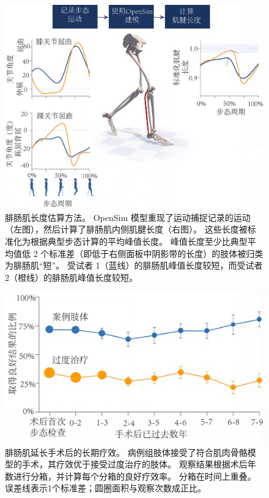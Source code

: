\begin{figure}[!htb]
	\centering
	\includegraphics[width=1.0\linewidth]{chap13/13_4}
	\caption{腓肠肌长度估算方法。
		OpenSim 模型重现了运动捕捉记录的运动（左图），然后计算了腓肠肌内侧肌腱长度（右图）。
		这些长度被标准化为根据典型步态计算的平均峰值长度。
		峰值长度至少比典型平均值低 2 个标准差（即低于右侧面板中阴影带的长度）的肢体被归类为腓肠肌“短”。
		受试者 1（蓝线）的腓肠肌峰值长度较短，而受试者 2（橙线）的腓肠肌峰值长度较短\cite{rajagopal2020pre}。 \label{fig:13_4}}
\end{figure}


\begin{figure}[!htb]
	\centering
	\includegraphics[width=0.7\linewidth]{chap13/13_5}
	\caption{腓肠肌延长手术后的长期疗效。
		病例组肢体接受了符合肌肉骨骼模型的手术，其疗效优于接受过度治疗的肢体。
		观察结果根据术后年数进行分箱，并计算每个分箱的良好疗效率。
		分箱在时间上重叠。
		误差线表示1个标准差；圆圈面积与观察次数成正比\cite{rajagopal2020pre}。 \label{fig:13_5}}
\end{figure}


